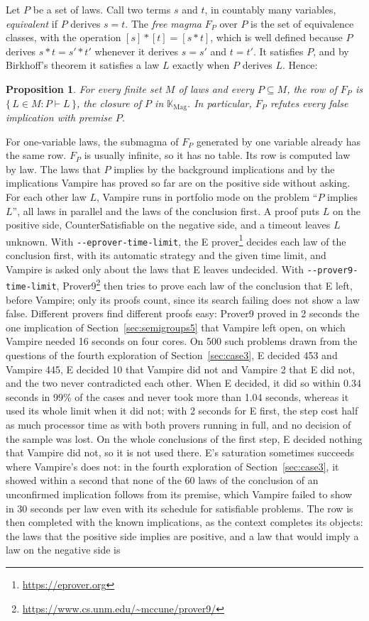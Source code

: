\documentclass[11pt,a4paper]{article}
\newtheorem{proposition}{Proposition}
\theoremstyle{definition}
\theoremstyle{remark}
\newcommand{\code}[1]{\texttt{#1}}
\begin{document}
Let $P$ be a set of laws. Call two terms $s$ and $t$, in countably many variables, \emph{equivalent} if $P$ derives $s = t$. The \emph{free magma} $F_P$ over $P$ is the set of equivalence classes, with the operation $[s] * [t] = [s * t]$, which is well defined because $P$ derives $s * t = s' * t'$ whenever it derives $s = s'$ and $t = t'$. It satisfies $P$, and by Birkhoff's theorem it satisfies a law $L$ exactly when $P$ derives $L$. Hence:
\begin{proposition}
For every finite set $M$ of laws and every $P \subseteq M$, the row of $F_P$ is $\{\, L \in M : P \vdash L \,\}$, the closure of $P$ in $\mathbb{K}_{\mathrm{Mag}}$. In particular, $F_P$ refutes every false implication with premise $P$.
\end{proposition}
For one-variable laws, the submagma of $F_P$ generated by one variable already has the same row. $F_P$ is usually infinite, so it has no table. Its row is computed law by law. The laws that $P$ implies by the background implications and by the implications Vampire has proved so far are on the positive side without asking. For each other law $L$, Vampire runs in portfolio mode on the problem ``$P$ implies $L$'', all laws in parallel and the laws of the conclusion first. A proof puts $L$ on the positive side, CounterSatisfiable on the negative side, and a timeout leaves $L$ unknown. With \code{-{}-eprover-time-limit}, the E prover\footnote{\url{https://eprover.org}} decides each law of the conclusion first, with its automatic strategy and the given time limit, and Vampire is asked only about the laws that E leaves undecided. With \code{-{}-prover9-time-limit}, Prover9\footnote{\url{https://www.cs.unm.edu/~mccune/prover9/}} then tries to prove each law of the conclusion that E left, before Vampire; only its proofs count, since its search failing does not show a law false. Different provers find different proofs easy: Prover9 proved in 2 seconds the one implication of Section~\ref{sec:semigroups5} that Vampire left open, on which Vampire needed 16 seconds on four cores. On 500 such problems drawn from the questions of the fourth exploration of Section~\ref{sec:case3}, E decided 453 and Vampire 445, E decided 10 that Vampire did not and Vampire 2 that E did not, and the two never contradicted each other. When E decided, it did so within 0.34 seconds in 99\% of the cases and never took more than 1.04 seconds, whereas it used its whole limit when it did not; with 2 seconds for E first, the step cost half as much processor time as with both provers running in full, and no decision of the sample was lost. On the whole conclusions of the first step, E decided nothing that Vampire did not, so it is not used there. E's saturation sometimes succeeds where Vampire's does not: in the fourth exploration of Section~\ref{sec:case3}, it showed within a second that none of the 60 laws of the conclusion of an unconfirmed implication follows from its premise, which Vampire failed to show in 30 seconds per law even with its schedule for satisfiable problems. The row is then completed with the known implications, as the context completes its objects: the laws that the positive side implies are positive, and a law that would imply a law on the negative side is 
\end{document}
